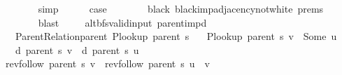 \begin{isabellebody}
\ \ \ \ \ \ \isamarkupfalse%
\ simp{\isacharplus}{\kern0pt}\isanewline
\ \ \ \ \isamarkupfalse%
\ {\isacharquery}{\kern0pt}case\isanewline
\ \ \ \ \ \ \isamarkupfalse%
\ black\ black{\isacharunderscore}{\kern0pt}imp{\isacharunderscore}{\kern0pt}adjacency{\isacharunderscore}{\kern0pt}not{\isacharunderscore}{\kern0pt}white\ {\isachardoublequoteopen}{}{\isachardot}{\kern0pt}prems{\isachardoublequoteclose}{\isacharparenleft}{\kern0pt}{}{\isacharparenright}{\kern0pt}\isanewline
\ \ \ \ \ \ \isamarkupfalse%
\ blast\isanewline
\ \ \isamarkupfalse%
\isanewline
{}\isamarkupfalse%
%
\endisatagproof
{\isafoldproof}%
%
\isadelimproof
\isanewline
%
\endisadelimproof
\isanewline
{}\isamarkupfalse%
\ {\isacharparenleft}{\kern0pt}\ alt{\isacharunderscore}{\kern0pt}bfs{\isacharunderscore}{\kern0pt}valid{\isacharunderscore}{\kern0pt}input{\isacharparenright}{\kern0pt}\ parent{\isacharunderscore}{\kern0pt}imp{\isacharunderscore}{\kern0pt}d{\isacharcolon}{\kern0pt}\isanewline
\ \ \ {\isachardoublequoteopen}Parent{\isacharunderscore}{\kern0pt}Relation{\isachardot}{\kern0pt}parent\ {\isacharparenleft}{\kern0pt}P{\isacharunderscore}{\kern0pt}lookup\ {\isacharparenleft}{\kern0pt}parent\ s{\isacharparenright}{\kern0pt}{\isacharparenright}{\kern0pt}{\isachardoublequoteclose}\isanewline
\ \ \ {\isachardoublequoteopen}P{\isacharunderscore}{\kern0pt}lookup\ {\isacharparenleft}{\kern0pt}parent\ s{\isacharparenright}{\kern0pt}\ v\ {\isacharequal}{\kern0pt}\ Some\ u{\isachardoublequoteclose}\isanewline
\ \ \ {\isachardoublequoteopen}d\ {\isacharparenleft}{\kern0pt}parent\ s{\isacharparenright}{\kern0pt}\ v\ {\isacharequal}{\kern0pt}\ d\ {\isacharparenleft}{\kern0pt}parent\ s{\isacharparenright}{\kern0pt}\ u\ {\isacharplus}{\kern0pt}\ {}{\isachardoublequoteclose}\isanewline
%
\isadelimproof
%
\endisadelimproof
%
\isatagproof
{}\isamarkupfalse%
\ {\isacharminus}{\kern0pt}\isanewline
\ \ \isamarkupfalse%
\ {\isachardoublequoteopen}rev{\isacharunderscore}{\kern0pt}follow\ {\isacharparenleft}{\kern0pt}parent\ s{\isacharparenright}{\kern0pt}\ v\ {\isacharequal}{\kern0pt}\ rev{\isacharunderscore}{\kern0pt}follow\ {\isacharparenleft}{\kern0pt}parent\ s{\isacharparenright}{\kern0pt}\ u\ {\isacharat}{\kern0pt}\ {\isacharbrackleft}{\kern0pt}v{\isacharbrackright}{\kern0pt}{\isachardoublequoteclose}\isanewline
\ \ \ \ \isamarkupfalse%

\end{isabellebody}
